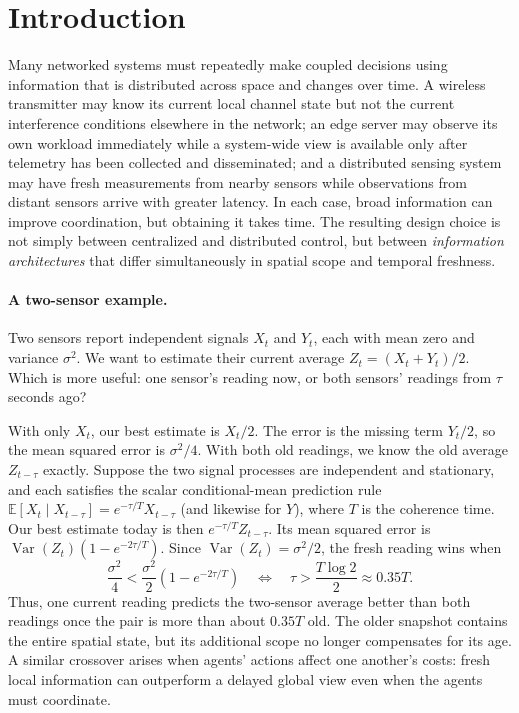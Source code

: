 \documentclass[11pt]{article}
\begin{document}
\section{Introduction}
\label{sec:introduction}

Many networked systems must repeatedly make coupled decisions using information
that is distributed across space and changes over time. A wireless transmitter
may know its current local channel state but not the current interference
conditions elsewhere in the network; an edge server may observe its own
workload immediately while a system-wide view is available only after telemetry
has been collected and disseminated; and a distributed sensing system may have
fresh measurements from nearby sensors while observations from distant sensors
arrive with greater latency. In each case, broad information can improve
coordination, but obtaining it takes time. The resulting design choice is not
simply between centralized and distributed control, but between
\emph{information architectures} that differ simultaneously in spatial scope
and temporal freshness.

\paragraph*{A two-sensor example.}
Two sensors report independent signals $X_t$ and $Y_t$, each with mean zero
and variance $\sigma^2$. We want to estimate their current average
$Z_t=(X_t+Y_t)/2$. Which is more useful: one sensor's reading now, or both
sensors' readings from $\tau$ seconds ago?

With only $X_t$, our best estimate is $X_t/2$. The error is the missing term
$Y_t/2$, so the mean squared error is $\sigma^2/4$. With both old readings,
we know the old average $Z_{t-\tau}$ exactly. Suppose the two signal processes are independent and stationary, and each
satisfies the scalar conditional-mean prediction rule
$\mathbb E[X_t\mid X_{t-\tau}]=e^{-\tau/T}X_{t-\tau}$ (and likewise
for $Y$), where $T$ is the coherence time. Our best estimate today is then $e^{-\tau/T}Z_{t-\tau}$.
Its mean squared error is
$\operatorname{Var}(Z_t)(1-e^{-2\tau/T})$. Since
$\operatorname{Var}(Z_t)=\sigma^2/2$, the fresh reading wins when
\[
    \frac{\sigma^2}{4}
    <\frac{\sigma^2}{2}(1-e^{-2\tau/T})
    \quad\Longleftrightarrow\quad
    \tau>\frac{T\log 2}{2}\approx 0.35T.
\]
Thus, one current reading predicts the two-sensor average better than both
readings once the pair is more than about $0.35T$ old. The older snapshot
contains the entire spatial state, but its additional scope no longer
compensates for its age. A similar crossover arises when agents' actions
affect one another's costs: fresh local information can outperform a
delayed global view even when the agents must coordinate.
\end{document}
